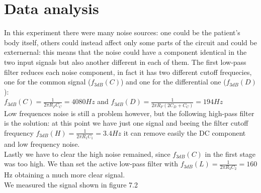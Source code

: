 \section{Data analysis}
In this experiment there were many noise sources: one could be the patient's body itself, others could instead affect only some parts of the circuit and could be externernal: this means that the noise could have a component identical in the two input signals but also another different in each of them. The first low-pass filter reduces each noise component, in fact it has two different cutoff frequecies, one for the common signal ($f_{3dB}(C)$) and one for the differential one ($f_{3dB}(D)$):\\
$f_{3dB}(C) = \frac{1}{2 \pi R_F C_C} = 4080 Hz$ and $f_{3dB}(D) = \frac{1}{2 \pi R_F (2 C_D + C_C)} = 194 Hz$\\
Low frequences noise is still a problem however, but the following high-pass filter is the solution: at this point we have just one signal and beeing the filter cutoff frequency $f_{3dB}(H) = \frac{1}{2 \pi R_1 C_1} = 3.4 Hz$ it can remove easily the DC component and low frequency noise.\\
Lastly we have to clear the high noise remained, since $f_{3dB}(C)$ in the first stage was too high. We than set the active low-pass filter with $f_{3dB}(L) = \frac{1}{2 \pi R_3 C_2} = 160$ Hz obtaining a much more clear signal.\\
We measured the signal shown in figure 7.2
